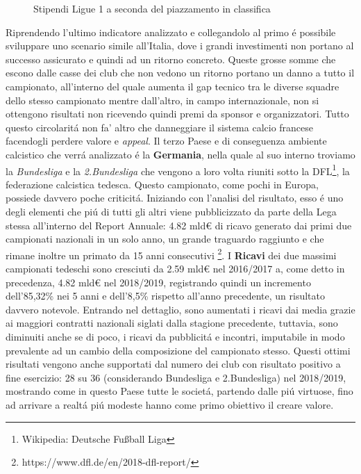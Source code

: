 \documentclass[
    corpo=12pt,
    oneside,
    evenboxes,
    tipotesi=triennale,
    stile=classica,
    oldstyle,
    autoretitolo,
    greek,
]{toptesi}
\begin{document}
\begin{interlinea}{1.5}
\begin{figure}
    \caption{Stipendi Ligue 1 a seconda del piazzamento in classifica}
    \label{stipendi_ligue1}
\end{figure}
Riprendendo l'ultimo indicatore analizzato e collegandolo al primo \'e possibile sviluppare uno scenario simile all'Italia, dove
i grandi investimenti non portano al successo assicurato e quindi ad un ritorno concreto. Queste grosse somme che escono dalle casse 
dei club che non vedono un ritorno portano un danno a tutto il campionato, all'interno del quale aumenta il gap tecnico tra le diverse squadre dello
stesso campionato mentre dall'altro, in campo internazionale, non si ottengono risultati non ricevendo quindi premi da sponsor e organizzatori.
Tutto questo circolarit\'a non fa' altro che danneggiare il sistema calcio francese facendogli perdere valore e \emph{appeal}.\newline
Il terzo Paese e di conseguenza ambiente calcistico che verr\'a analizzato \'e la \textbf{Germania}, nella quale al suo interno troviamo 
la \emph{Bundesliga} e la \emph{2.Bundesliga} che vengono a loro volta riuniti sotto la DFL\footnote{Wikipedia: Deutsche Fußball Liga}, la
federazione calcistica tedesca.\newline
Questo campionato, come pochi in Europa, possiede davvero poche criticit\'a. Iniziando con l'analisi del risultato, 
esso \'e uno degli elementi che pi\'u di tutti gli altri viene pubblicizzato 
da parte della Lega stessa all'interno del Report Annuale: 4.82 mld€ di ricavo generato dai primi due campionati nazionali in un 
solo anno, un grande traguardo raggiunto e che rimane inoltre un primato da 15 anni consecutivi
\footnote{https://www.dfl.de/en/2018-dfl-report/}.\newline
I \textbf{Ricavi} dei due massimi campionati tedeschi sono cresciuti da 2.59 mld€ nel 2016/2017 a, come detto in precedenza, 4.82 mld€ nel 2018/2019, 
registrando quindi un incremento dell'85,32\% nei 5 anni e dell'8,5\% rispetto
all'anno precedente, un risultato davvero notevole. Entrando nel dettaglio, sono aumentati i ricavi dai media grazie ai maggiori contratti nazionali 
siglati dalla stagione precedente, tuttavia, sono diminuiti anche se di poco,
i ricavi da pubblicit\'a e incontri, imputabile in modo prevalente ad un cambio della composizione del campionato stesso.
Questi ottimi risultati vengono anche supportati dal numero dei club con risultato positivo a fine esercizio: 28 su 36 (considerando 
Bundesliga e 2.Bundesliga) nel 2018/2019, mostrando come in questo Paese tutte le societ\'a, partendo dalle pi\'u virtuose,
fino ad arrivare a realt\'a pi\'u modeste hanno come primo obiettivo il creare valore.\newline

\end{interlinea}
\end{document}
